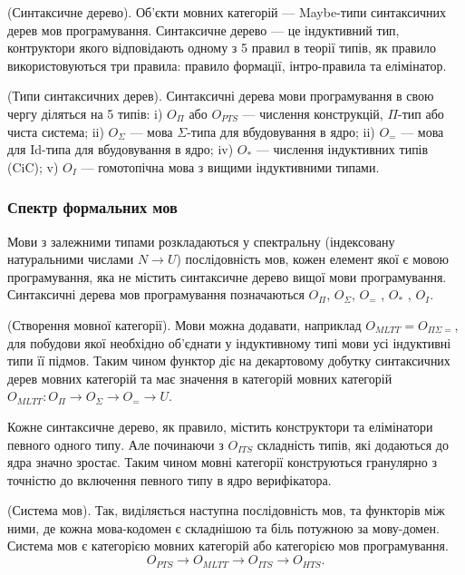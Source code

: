 \begin{definition} (Синтаксичне дерево).
Об'єкти мовних категорій --- Maybe-типи синтаксичних дерев мов програмування.
Синтаксичне дерево --- це індуктивний тип, контруктори якого відповідають
одному з 5 правил в теорії типів, як правило використовуються три правила:
правило формації, інтро-правила та елімінатор.

\begin{definition} (Типи синтаксичних дерев).
Синтаксичні дерева мови програмування в свою чергу діляться на 5 типів:
i) $O_\Pi$ або $O_{PTS}$ --- числення конструкцій, $\Pi$-тип або чиста система;
ii) $O_\Sigma$ --- мова $\Sigma$-типа для вбудовування в ядро;
ii) $O_{=}$ --- мова для Id-типа для вбудовування в ядро;
iv) $O_{*}$ --- числення індуктивних типів (CiC);
v) $O_{I}$ --- гомотопічна мова з вищими індуктивними типами.
\end{definition}

\subsubsection*{Спектр формальних мов}

Мови з залежними типами розкладаються у
спектральну (індексовану натуральними числами $N \rightarrow U$)
послідовність  мов, кожен елемент якої є мовою програмування,
яка не містить синтаксичне дерево вищої мови програмування.
Синтаксичні дерева мов програмування позначаються $O_\Pi$,
$O_\Sigma$, $O_{=}$ , $O_{*}$ , $O_{I}$.

\begin{definition} (Створення мовної категорії).
Мови можна додавати, наприклад $O_{MLTT} = O_{\Pi\Sigma=}$, для побудови якої необхідно
об'єднати у індуктивному типі мови усі індуктивні типи її підмов.
Таким чином функтор діє на декартовому добутку синтаксичних дерев мовних категорій
та має значення в категорій мовних категорій
$O_{MLTT} : O_\Pi \rightarrow O_\Sigma \rightarrow O_= \rightarrow U$.
\end{definition}

Кожне синтаксичне дерево, як правило, містить конструктори
та елімінатори певного одного типу. Але починаючи з $O_{ITS}$
складність типів, які додаються до ядра значно зростає.
Таким чином мовні категорії конструються гранулярно з
точністю до включення певного типу в ядро верифікатора.

\begin{definition} (Система мов).
Так, виділяється наступна послідовність мов, та функторів між ними,
де кожна мова-кодомен є складнішою та біль потужною за мову-домен.
Система мов є категорією мовних категорій або категорією мов програмування.
$$
O_{PTS} \rightarrow O_{MLTT} \rightarrow O_{ITS} \rightarrow O_{HTS}.
$$
\end{definition}


\end{definition}
